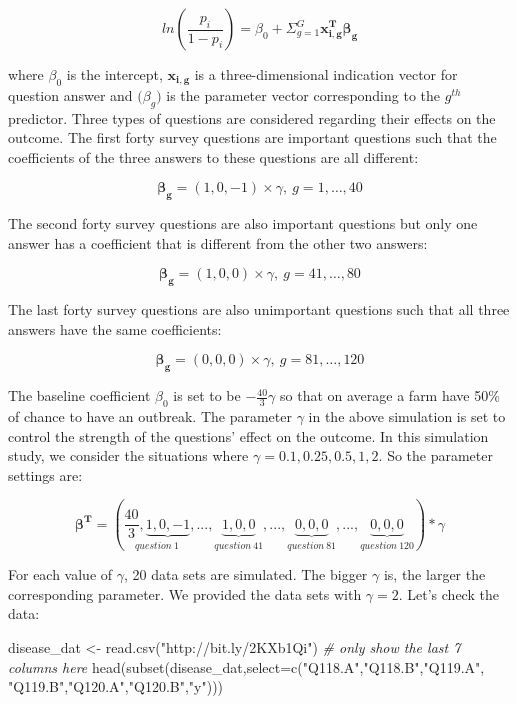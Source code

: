 \documentclass[
  12pt,
]{krantz}
\makeatletter
\newenvironment{Shaded}{\begin{snugshade}}{\end{snugshade}}
\newcommand{\AttributeTok}[1]{\textcolor[rgb]{0.61,0.61,0.61}{#1}}
\newcommand{\CommentTok}[1]{\textcolor[rgb]{0.37,0.37,0.37}{\textit{#1}}}
\newcommand{\FunctionTok}[1]{\textcolor[rgb]{0,0,0}{#1}}
\newcommand{\NormalTok}[1]{#1}
\newcommand{\OtherTok}[1]{\textcolor[rgb]{0.37,0.37,0.37}{#1}}
\newcommand{\StringTok}[1]{\textcolor[rgb]{0.5,0.5,0.5}{#1}}
\newenvironment{kframe}{%
\medskip{}
\setlength{\fboxsep}{.8em}
 \def\at@end@of@kframe{}%
 \ifinner\ifhmode%
  \def\at@end@of@kframe{\end{minipage}}%
  \begin{minipage}{\columnwidth}%
 \fi\fi%
 \def\FrameCommand##1{\hskip\@totalleftmargin \hskip-\fboxsep
 \colorbox{shadecolor}{##1}\hskip-\fboxsep
     \hskip-\linewidth \hskip-\@totalleftmargin \hskip\columnwidth}%
 \MakeFramed {\advance\hsize-\width
   \@totalleftmargin\z@ \linewidth\hsize
   \@setminipage}}%
 {\par\unskip\endMakeFramed%
 \at@end@of@kframe}
\renewenvironment{Shaded}{\begin{kframe}}{\end{kframe}}
\makeatother
\begin{document}
\[ln(\frac{p_i}{1-p_i})=\beta_0 + \Sigma_{g=1}^G\mathbf{x_{i,g}^T\beta_{g}}\]

where \(\beta_0\) is the intercept, \(\mathbf{x_{i,g}}\) is a three-dimensional indication vector for question answer and \(\mathbf(\beta_g)\) is the parameter vector corresponding to the \(g^{th}\) predictor. Three types of questions are considered regarding their effects on the outcome. The first forty survey questions are important questions such that the coefficients of the three answers to these
questions are all different:

\[\mathbf{\beta_g}=(1,0,-1)\times \gamma,\ g=1,\dots,40\]

The second forty survey questions are also important questions but only one answer has a coefficient that is different from the other two answers:

\[\mathbf{\beta_g}=(1,0,0)\times \gamma,\ g=41,\dots,80\]

The last forty survey questions are also unimportant questions such that all three answers have the same coefficients:

\[\mathbf{\beta_g}=(0,0,0)\times \gamma,\ g=81,\dots,120\]

The baseline coefficient \(\beta_0\) is set to be \(-\frac{40}{3}\gamma\) so that on average a farm have 50\% of chance to have an outbreak. The parameter \(\gamma\) in the above simulation is set to control the strength of the questions' effect on the outcome. In this simulation study, we consider the situations where \(\gamma = 0.1, 0.25, 0.5, 1, 2\). So the parameter settings are:

\[\mathbf{\beta^{T}} = \left(\underset{question\ 1}{\frac{40}{3},\underbrace{1,0,-1}},...,\underset{question\ 41}{\underbrace{1,0,0}},...,\underset{question\ 81}{\underbrace{0,0,0}},...,\underset{question\ 120}{\underbrace{0,0,0}}\right)*\gamma\]

For each value of \(\gamma\), 20 data sets are simulated. The bigger \(\gamma\) is, the larger the corresponding parameter. We provided the data sets with \(\gamma = 2\). Let's check the data:

\begin{Shaded}
\begin{Highlighting}[]
\NormalTok{disease\_dat }\OtherTok{\textless{}{-}} \FunctionTok{read.csv}\NormalTok{(}\StringTok{"http://bit.ly/2KXb1Qi"}\NormalTok{)}
\CommentTok{\# only show the last 7 columns here}
\FunctionTok{head}\NormalTok{(}\FunctionTok{subset}\NormalTok{(disease\_dat,}\AttributeTok{select=}\FunctionTok{c}\NormalTok{(}\StringTok{"Q118.A"}\NormalTok{,}\StringTok{"Q118.B"}\NormalTok{,}\StringTok{"Q119.A"}\NormalTok{,}
                                 \StringTok{"Q119.B"}\NormalTok{,}\StringTok{"Q120.A"}\NormalTok{,}\StringTok{"Q120.B"}\NormalTok{,}\StringTok{"y"}\NormalTok{))) }
\end{Highlighting}
\end{Shaded}
\end{document}
